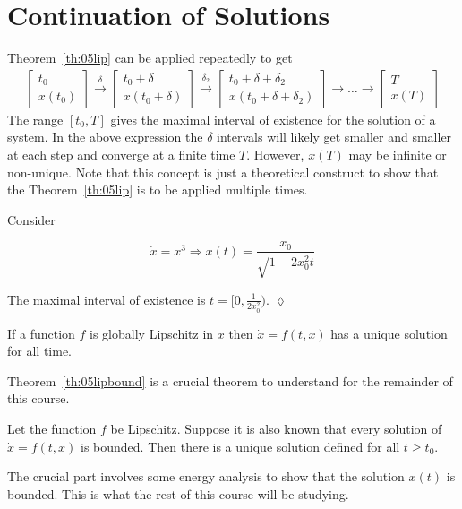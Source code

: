\section{Continuation of Solutions}
Theorem~\ref{th:05lip} can be applied repeatedly to get
\begin{align*}
\left[\begin{array}{c} t_0 \\ x(t_0) \end{array}\right] \xrightarrow{\delta}
\left[\begin{array}{c} t_0+\delta \\ x(t_0+\delta) \end{array}\right] \xrightarrow{\delta_2}
\left[\begin{array}{c} t_0+\delta+\delta_2 \\ x(t_0+\delta+\delta_2) \end{array}\right] \rightarrow{}
\ldots \rightarrow{}
\left[\begin{array}{c} T \\ x(T) \end{array}\right]
\end{align*}
The range $[t_0, T]$ gives the maximal interval of existence for the solution of a system.
In the above expression the $\delta$ intervals will likely get smaller and smaller at each step and converge at a finite time $T$.
However, $x(T)$ may be infinite or non-unique.
Note that this concept is just a theoretical construct to show that the Theorem~\ref{th:05lip} is to be applied multiple times.

\begin{example}
Consider

\begin{equation*}
\dot{x} = x^3 \Rightarrow x(t) = \frac{x_0}{\sqrt{1-2x_0^2t}}
\end{equation*}

The maximal interval of existence is $t=[0,\frac{1}{2x_0^2})$.%
$\lozenge$
\end{example}

\begin{theorem}
If a function $f$ is globally Lipschitz in $x$ then $\dot{x}=f(t,x)$ has a unique solution for all time.
\end{theorem}

Theorem~\ref{th:05lipbound} is a crucial theorem to understand for the remainder of this course.
\begin{theorem}%
\label{th:05lipbound}
Let the function $f$ be Lipschitz.
Suppose it is also known that every solution of $\dot{x}=f(t,x)$ is bounded.
Then there is a unique solution defined for all $t\geq t_0$.
\end{theorem}

The crucial part involves some energy analysis to show that the solution $x(t)$ is bounded.
This is what the rest of this course will be studying.%
